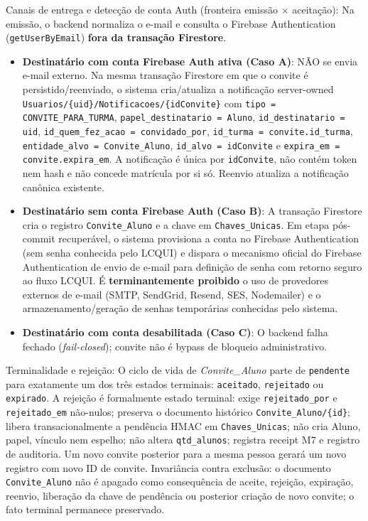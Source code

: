 \begin{regra}
Canais de entrega e detecção de conta Auth (fronteira emissão $\times$ aceitação):
Na emissão, o backend normaliza o e-mail e consulta o Firebase Authentication (\texttt{getUserByEmail}) \textbf{fora da transação Firestore}.
\begin{itemize}
  \item \textbf{Destinatário com conta Firebase Auth ativa (Caso A)}: NÃO se envia e-mail externo. Na mesma transação Firestore em que o convite é persistido/reenviado, o sistema cria/atualiza a notificação server-owned \texttt{Usuarios/\{uid\}/Notificacoes/\{idConvite\}} com \texttt{tipo = CONVITE\_PARA\_TURMA}, \texttt{papel\_destinatario = Aluno}, \texttt{id\_destinatario = uid}, \texttt{id\_quem\_fez\_acao = convidado\_por}, \texttt{id\_turma = convite.id\_turma}, \texttt{entidade\_alvo = Convite\_Aluno}, \texttt{id\_alvo = idConvite} e \texttt{expira\_em = convite.expira\_em}. A notificação é única por \texttt{idConvite}, não contém token nem hash e não concede matrícula por si só. Reenvio atualiza a notificação canônica existente.
  \item \textbf{Destinatário sem conta Firebase Auth (Caso B)}: A transação Firestore cria o registro \texttt{Convite\_Aluno} e a chave em \texttt{Chaves\_Unicas}. Em etapa pós-commit recuperável, o sistema provisiona a conta no Firebase Authentication (sem senha conhecida pelo LCQUI) e dispara o mecanismo oficial do Firebase Authentication de envio de e-mail para definição de senha com retorno seguro ao fluxo LCQUI. É \textbf{terminantemente proibido} o uso de provedores externos de e-mail (SMTP, SendGrid, Resend, SES, Nodemailer) e o armazenamento/geração de senhas temporárias conhecidas pelo sistema.
  \item \textbf{Destinatário com conta desabilitada (Caso C)}: O backend falha fechado (\textit{fail-closed}); convite não é bypass de bloqueio administrativo.
\end{itemize}

Terminalidade e rejeição:
O ciclo de vida de \textit{Convite\_Aluno} parte de \texttt{pendente} para exatamente um dos três estados terminais: \texttt{aceitado}, \texttt{rejeitado} ou \texttt{expirado}.
A rejeição é formalmente estado terminal: exige \texttt{rejeitado\_por} e \texttt{rejeitado\_em} não-nulos; preserva o documento histórico \texttt{Convite\_Aluno/\{id\}}; libera transacionalmente a pendência HMAC em \texttt{Chaves\_Unicas}; não cria Aluno, papel, vínculo nem espelho; não altera \texttt{qtd\_alunos}; registra receipt M7 e registro de auditoria. Um novo convite posterior para a mesma pessoa gerará um novo registro com novo ID de convite.
Invariância contra exclusão: o documento \texttt{Convite\_Aluno} não é apagado como consequência
de aceite, rejeição, expiração, reenvio, liberação da chave de pendência ou posterior criação de novo
convite; o fato terminal permanece preservado.


\end{regra}

